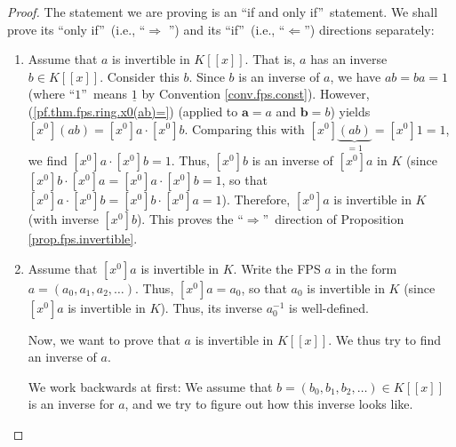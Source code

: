 \begin{proof}
The statement we are proving is an \textquotedblleft if and only
if\textquotedblright\ statement. We shall prove its \textquotedblleft only
if\textquotedblright\ (i.e., \textquotedblleft$\Longrightarrow$%
\textquotedblright) and its \textquotedblleft if\textquotedblright\ (i.e.,
\textquotedblleft$\Longleftarrow$\textquotedblright) directions separately:

\begin{enumerate}
\item[$\Longrightarrow:$] Assume that $a$ is invertible in $K\left[  \left[
x\right]  \right]  $. That is, $a$ has an inverse $b\in K\left[  \left[
x\right]  \right]  $. Consider this $b$. Since $b$ is an inverse of $a$, we
have $ab=ba=1$ (where \textquotedblleft$1$\textquotedblright\ means
$\underline{1}$ by Convention \ref{conv.fps.const}). However,
(\ref{pf.thm.fps.ring.x0(ab)=}) (applied to $\mathbf{a}=a$ and $\mathbf{b}=b$)
yields $\left[  x^{0}\right]  \left(  ab\right)  =\left[  x^{0}\right]
a\cdot\left[  x^{0}\right]  b$. Comparing this with $\left[  x^{0}\right]
\underbrace{\left(  ab\right)  }_{=1}=\left[  x^{0}\right]  1=1$, we find
$\left[  x^{0}\right]  a\cdot\left[  x^{0}\right]  b=1$. Thus, $\left[
x^{0}\right]  b$ is an inverse of $\left[  x^{0}\right]  a$ in $K$ (since
$\left[  x^{0}\right]  b\cdot\left[  x^{0}\right]  a=\left[  x^{0}\right]
a\cdot\left[  x^{0}\right]  b=1$, so that $\left[  x^{0}\right]  a\cdot\left[
x^{0}\right]  b=\left[  x^{0}\right]  b\cdot\left[  x^{0}\right]  a=1$).
Therefore, $\left[  x^{0}\right]  a$ is invertible in $K$ (with inverse
$\left[  x^{0}\right]  b$). This proves the \textquotedblleft$\Longrightarrow
$\textquotedblright\ direction of Proposition \ref{prop.fps.invertible}.

\item[$\Longleftarrow:$] Assume that $\left[  x^{0}\right]  a$ is invertible
in $K$. Write the FPS $a$ in the form $a=\left(  a_{0},a_{1},a_{2}%
,\ldots\right)  $. Thus, $\left[  x^{0}\right]  a=a_{0}$, so that $a_{0}$ is
invertible in $K$ (since $\left[  x^{0}\right]  a$ is invertible in $K$).
Thus, its inverse $a_{0}^{-1}$ is well-defined.

Now, we want to prove that $a$ is invertible in $K\left[  \left[  x\right]
\right]  $. We thus try to find an inverse of $a$.

We work backwards at first: We assume that $b=\left(  b_{0},b_{1},b_{2}%
,\ldots\right)  \in K\left[  \left[  x\right]  \right]  $ is an inverse for
$a$, and we try to figure out how this inverse looks like.


\end{enumerate}
\end{proof}
